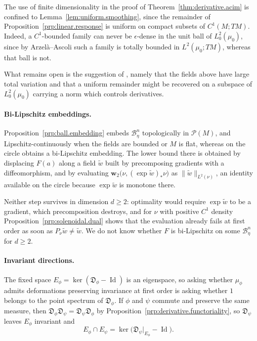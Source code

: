 \documentclass[11pt,reqno]{amsart}
\theoremstyle{plain}
\theoremstyle{definition}
\newcommand{\dw}{\mathbf{w}_2}
\newcommand{\D}{\mathfrak{D}}
\newcommand{\Prob}{\mathcal{P}}
\DeclareMathOperator{\Id}{Id}
\begin{document}
The use of finite dimensionality in the proof of Theorem~\ref{thm:derivative.acim} is confined to Lemma~\ref{lem:uniform.smoothing}, since the remainder of Proposition~\ref{prp:linear.response} is uniform on compact subsets of \( C^1(M;TM) \).
Indeed, a \( C^1 \)-bounded family can never be \( \epsilon \)-dense in the unit ball of \( L^2_0(\mu_0) \), since by Arzel\`a--Ascoli such a family is totally bounded in \( L^2(\mu_0;TM) \), whereas that ball is not.

What remains open is the suggestion of \cite[\S4.3]{kloeckner_optimal_2013}, namely that the fields above have large total variation and that a uniform remainder might be recovered on a subspace of \( L^2_0(\mu_0) \) carrying a norm which controls derivatives.

\medskip
\paragraph*{\textbf{Bi-Lipschitz embeddings}.}
Proposition~\ref{prp:ball.embedding} embeds \( \mathcal B^n_\eta \) topologically in \( \Prob(M) \), and Lipschitz-continuously when the fields are bounded or \( M \) is flat, whereas on the circle \cite[Proposition 3.1]{kloeckner_optimal_2013} obtains a bi-Lipschitz embedding.
The lower bound there is obtained by displacing \( F(a) \) along a field \( \tilde w \) built by precomposing gradients with a diffeomorphism, and by evaluating \( \dw\big(\nu,(\exp\tilde w)_\ast\nu\big) \) as \( \lVert\tilde w\rVert_{L^2(\nu)} \), an identity available on the circle because \( \exp\tilde w \) is monotone there.
    
Neither step survives in dimension \( d\ge2 \): optimality would require \( \exp\tilde w \) to be a gradient, which precomposition destroys, and for \( \nu \) with positive \( C^1 \) density Proposition~\ref{prp:solenoidal.dual} shows that the evaluation already fails at first order as soon as \( P_\nu\tilde w\neq\tilde w \).
We do not know whether \( F \) is bi-Lipschitz on some \( \mathcal B^n_\eta \) for \( d\ge2 \).

\medskip
\paragraph*{\textbf{Invariant directions}.}

The fixed space \( E_\phi=\ker(\D_\phi-\Id) \) is an eigenspace, so asking whether \( \mu_\phi \) admits deformations preserving invariance at first order is asking whether \( 1 \) belongs to the point spectrum of \( \D_\phi \).
If \( \phi \) and \( \psi \) commute and preserve the same measure, then \( \D_\phi\D_\psi=\D_\psi\D_\phi \) by Proposition~\ref{prp:derivative.functoriality}, so \( \D_\psi \) leaves \( E_\phi \) invariant and
\[
    E_\phi\cap E_\psi=\ker\big(\D_\psi|_{E_\phi}-\Id\big).
\]
\end{document}
